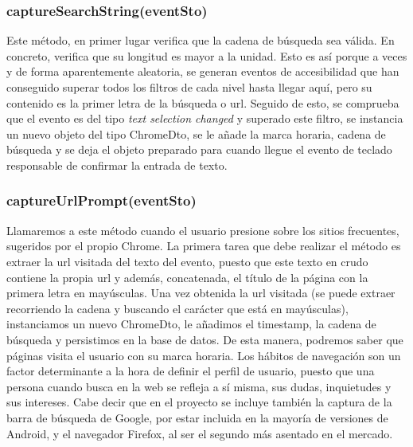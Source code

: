 \documentclass[12pt,a4paper,oneside]{book} %
\begin{document}
\subsubsection{captureSearchString(eventSto)}
Este método, en primer lugar verifica que la cadena de búsqueda sea válida. En concreto, verifica que su longitud es mayor a la unidad. Esto es así porque a veces y de forma aparentemente aleatoria, se generan eventos de accesibilidad que han conseguido superar todos los filtros de cada nivel hasta llegar aquí, pero su contenido es la primer letra de la búsqueda o url. 
\newline \newline 
Seguido de esto, se comprueba que el evento es del tipo \textit{text selection changed} y superado este filtro, se instancia un nuevo objeto del tipo ChromeDto, se le añade la marca horaria, cadena de búsqueda y se deja el objeto preparado para cuando llegue el evento de teclado responsable de confirmar la entrada de texto. 
\subsubsection{captureUrlPrompt(eventSto)}
Llamaremos a este método cuando el usuario presione sobre los sitios frecuentes, sugeridos por el propio Chrome. 
\newline \newline 
La primera tarea que debe realizar el método es extraer la url visitada del texto del evento, puesto que este texto en crudo contiene la propia url y además, concatenada, el título de la página con la primera letra en mayúsculas. 
\newline \newline 
Una vez obtenida la url visitada (se puede extraer recorriendo la cadena y buscando el carácter que está en mayúsculas), instanciamos un nuevo ChromeDto, le añadimos el timestamp, la cadena de búsqueda y persistimos en la base de datos. 
\newline \newline
De esta manera, podremos saber que páginas visita el usuario con su marca horaria. Los hábitos de navegación son un factor determinante a la hora de definir el perfil de usuario, puesto que una persona cuando busca en la web se refleja a sí misma, sus dudas, inquietudes y sus intereses. Cabe decir que en el proyecto se incluye también la captura de la barra de búsqueda de Google, por estar incluida en la mayoría de versiones de Android, y el navegador Firefox, al ser el segundo más asentado en el mercado. 
\end{document}
